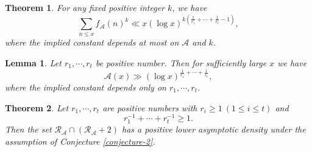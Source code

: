\documentclass[10pt,a4paper]{amsart}
\newtheorem{theorem}{Theorem}
\newtheorem{lemma}{Lemma}
\begin{document}
\begin{theorem}\label{propo:2}
For any fixed positive integer $k$, we have
$$
\sum_{n\le x}f_{\mathcal{A}}(n)^k\ll x (\log x)^{k\left(\frac{1}{r_1}+\cdots+\frac{1}{r_t}-1\right)},
$$
where the implied constant depends at most on $\mathcal{A}$ and $k$.
\end{theorem}

\begin{lemma}\label{lem1}
Let $r_1,\cdots, r_t$ be positive number. Then for sufficiently large $x$ we have
$$
\mathcal{A}(x)\gg (\log x)^{\frac{1}{r_1}+\cdots+\frac{1}{r_t}},
$$
where the implied constant depends only on $r_1,\cdots, r_t$.
\end{lemma}

\begin{theorem}\label{theorem-1}
Let $r_1,\cdots, r_t$ are positive numbers with $r_i\ge 1~(1\le i\le t)$ and 
$$
r_1^{-1}+\cdots+r_t^{-1}\ge 1.
$$
 Then
 the set $\mathcal{R}_{\mathcal{A}}\cap(\mathcal{R}_{\mathcal{A}}+2)$ has a positive lower asymptotic density under the assumption of Conjecture \ref{conjecture-2}.
\end{theorem}
\end{document}
